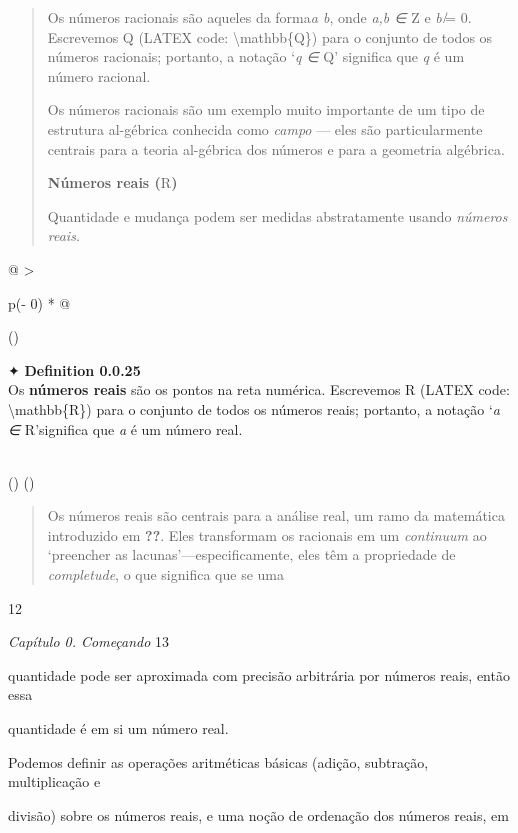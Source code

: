 \documentclass[
]{article}
\begin{document}
\begin{quote}
Os números racionais são aqueles da forma\emph{a b}, onde \emph{a,b ∈} Z
e \emph{b ̸}= 0. Escrevemos Q (LATEX code: \textbackslash mathbb\{Q\})
para o conjunto de todos os números racionais; portanto, a notação
`\emph{q ∈} Q' significa que \emph{q} é um número racional.

Os números racionais são um exemplo muito importante de um tipo de
estrutura al-gébrica conhecida como \emph{campo} --- eles são
particularmente centrais para a teoria al-gébrica dos números e para a
geometria algébrica.

\textbf{Números reais (}R\textbf{)}

Quantidade e mudança podem ser medidas abstratamente usando
\emph{números reais}.
\end{quote}

\begin{longtable}[]{@{}
  >{\raggedright\arraybackslash}p{(\columnwidth - 0\tabcolsep) * }@{}}
\toprule()
\begin{minipage}[b]{\linewidth}\raggedright
✦ \textbf{Definition 0.0.25}\\
Os \textbf{números reais} são os pontos na reta numérica. Escrevemos R
(LATEX code: \textbackslash mathbb\{R\}) para o conjunto de todos os
números reais; portanto, a notação `\emph{a ∈} R'significa que \emph{a}
é um número real.\strut
\end{minipage} \\
\midrule()
\endhead
\bottomrule()
\end{longtable}

\begin{quote}
Os números reais são centrais para a análise real, um ramo da matemática
introduzido em \textbf{??}. Eles transformam os racionais em um
\emph{continuum} ao `preencher as lacunas'---especificamente, eles têm a
propriedade de \emph{completude}, o que significa que se uma
\end{quote}

12

\emph{Capítulo 0. Começando} 13

quantidade pode ser aproximada com precisão arbitrária por números
reais, então essa

quantidade é em si um número real.

Podemos definir as operações aritméticas básicas (adição, subtração,
multiplicação e

divisão) sobre os números reais, e uma noção de ordenação dos números
reais, em
\end{document}
